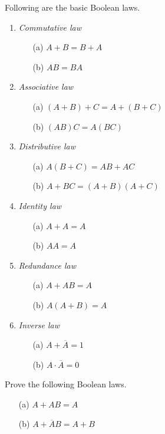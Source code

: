 Following are the basic Boolean laws.
\begin{enumerate}
\item {\em Commutative law}
\begin{itemize}
\item[(a)] $A+B=B+A$

\item[(b)] $AB=BA$
\end{itemize}

\item {\em Associative law}
\begin{itemize}
\item[(a)] $(A+B)+C=A+(B+C)$

\item[(b)] $(AB)C=A(BC)$
\end{itemize}

\item {\em Distributive law}
\begin{itemize}
\item[(a)] $A(B+C)=AB+AC$

\item[(b)] $A+BC=(A+B)(A+C)$
\end{itemize}

\item {\em Identity law}
\begin{itemize}
\item[(a)] $A+A=A$

\item[(b)] $AA=A$
\end{itemize}

\item {\em Redundance law}
\begin{itemize}
\item[(a)] $A+AB=A$

\item[(b)] $A(A+B)=A$
\end{itemize}

\item {\em Inverse law}
\begin{itemize}
\item[(a)] $A+\overline{A}=1$

\item[(b)] $A\cdot \overline{A}=0$
\end{itemize}
\end{enumerate}

\smallskip
\begin{example}\label{exam6.24}
Prove the following Boolean laws.
\begin{itemize}
\item[(a)] $A+AB=A$

\item[(b)] $A+\overline{A}B=A+B$
\end{itemize}
\end{example}

